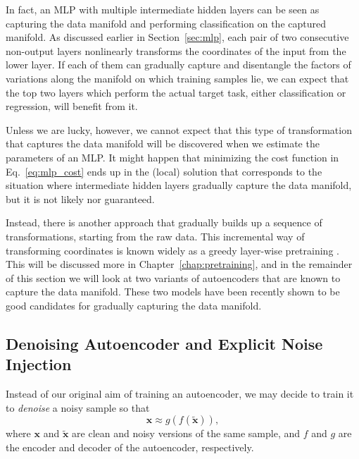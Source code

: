 \documentclass[dissertation,nocontribution,draft*]{aaltoseries}
\newcommand{\vect}[1]{\mathbf{#1}}
\newcommand{\vx}[0]{\vect{x}}
\begin{document}
In fact, an MLP with multiple intermediate hidden layers can
be seen as capturing the data manifold and performing
classification on the captured manifold. As discussed
earlier in Section~\ref{sec:mlp}, each pair of two
consecutive non-output layers nonlinearly transforms the
coordinates of the input from the lower layer. If each of
them can gradually capture and disentangle the factors of
variations along the manifold on which training samples lie,
we can expect that the top two layers which perform the
actual target task, either classification or regression,
will benefit from it.

Unless we are lucky, however, we cannot expect that this type of
transformation that captures the data manifold will be
discovered when
we estimate the parameters of an MLP. It might happen that
minimizing the cost function in Eq.~\eqref{eq:mlp_cost} ends
up in the (local) solution that corresponds to the situation
where intermediate hidden layers gradually capture the data
manifold, but it is not likely nor guaranteed.

Instead, there is another approach that gradually builds up
a sequence of transformations, starting from the raw data.
This incremental way of transforming coordinates is known
widely as a greedy layer-wise pretraining
\citep{Hinton2006}. This will be discussed more in
Chapter~\ref{chap:pretraining}, and in the remainder of this
section we will look at two variants of autoencoders that
are known to capture the data manifold. These two models
have been recently shown to be good candidates for gradually
capturing the data manifold.


\subsection{Denoising Autoencoder and Explicit Noise
Injection}
\label{sec:dae}


Instead of our original aim of training an autoencoder, we
may decide to train it to \textit{denoise} a noisy sample so
that 
\[
\vx \approx g(f(\tilde{\vx})),
\]
where $\vx$ and $\tilde{\vx}$ are clean and noisy versions
of the same sample, and $f$ and $g$ are the encoder and
decoder of the autoencoder, respectively. 
\end{document}
